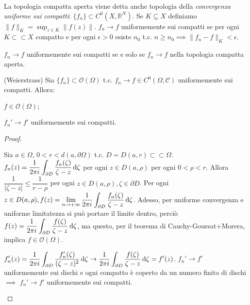 La topologia compatta aperta viene detta anche topologia della \textit{convergenza uniforme sui compatti}: $\{f_n\} \subset C^0(X, \mathbb{R}^N)$. Se $K \subseteq X$ definiamo $\displaystyle \|f\|_K=\sup_{z \in K} \|f(z)\|$.
$f_n \rightarrow f$ uniformemente sui compatti se per ogni $K \subset \subset X$ compatto e per ogni $\epsilon>0$ esiste $n_0$ t.c. $n \ge n_0 \implies \|f_n-f\|_K<\epsilon$.

\begin{exc}
  $f_n \rightarrow f$ uniformemente sui compatti se e solo se $f_n \rightarrow f$ nella topologia compatta aperta.
\end{exc}

\begin{thm}
  (Weierstrass) Sia $\{f_n\} \subset \mathcal{O}(\Omega)$ t.c. $f_n \rightarrow f \in C^0(\Omega, \mathcal{C})$ uniformemente sui compatti. Allora:
  \begin{nlist}
    \item $f \in \mathcal{O}(\Omega)$;
    \item $f_n' \rightarrow f'$ uniformemente sui compatti.
  \end{nlist}
\end{thm}

\begin{proof}
  \begin{nlist}
    \item Sia $a \in \Omega$, $0<r<d(a, \partial\Omega)$ t.c. $D=D(a, r) \subset \subset \Omega$. $\displaystyle f_n(z)=\frac{1}{2\pi i} \int_{\partial D} \frac{f_n(\zeta)}{\zeta-z} \mathop{}\!\mathrm{d} \zeta$ per ogni $z \in D(a, \rho)$ per ogni $0<\rho<r$.
    Allora $\dfrac{1}{|\zeta-z|} \le \dfrac{1}{r-\rho}$ per ogni $z \in D(a, \rho), \zeta \in \partial{D}$.
    Per ogni $\displaystyle z \in D(a, \rho), f(z)=\lim_{n \rightarrow +\infty} \frac{1}{2\pi i} \int_{\partial D} \frac{f_n(\zeta)}{\zeta-z} \mathop{}\!\mathrm{d} \zeta$.
    Adesso, per uniforme convergenza e uniforme limitatezza si può portare il limite dentro, perciò $\displaystyle f(z)=\frac{1}{2\pi i}\int_{\partial D} \frac{f(\zeta)}{\zeta-z} \mathop{}\!\mathrm{d} \zeta$, ma questo, per il teorema di Cauchy-Goursat+Morera, implica $f \in \mathcal{O}(\Omega)$.
    \item $\displaystyle f_n'(z)=\frac{1}{2\pi i} \int_{\partial D} \frac{f_n'(\zeta)}{(\zeta-z)^2}\mathop{}\!\mathrm{d}\zeta \rightarrow \frac{1}{2\pi i} \int_{\partial D} \frac{f(\zeta)}{\zeta-z} \mathop{}\!\mathrm{d}\zeta=f'(z)$.
    $f_n' \rightarrow f'$ uniformemente sui dischi e ogni compatto è coperto da un numero finito di dischi $\implies$ $f_n' \rightarrow f'$ uniformemente sui compatti.
  \end{nlist}
\end{proof}
